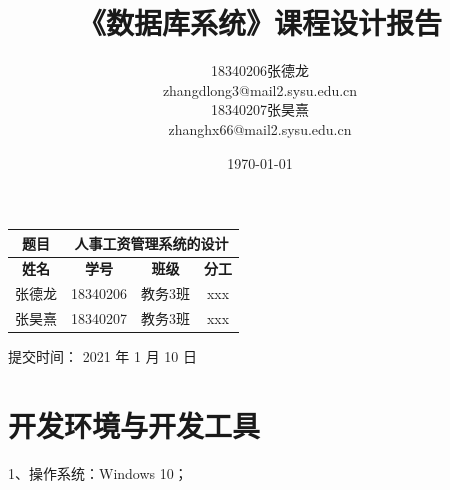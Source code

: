 \documentclass[withoutpreface,bwprint]{cumcmthesis} %
\title{《数据库系统》课程设计报告}
\author{18340206张德龙 \\
	zhangdlong3@mail2.sysu.edu.cn \\
		18340207张昊熹 \\ 
		zhanghx66@mail2.sysu.edu.cn
}
\date{\today}
\begin{document}
	\maketitle 
\begin{table}[H]
\centering
\label{tab:my-table}
\begin{threeparttable}
\begin{tabular}{|c|c|c|c|}
\hline
\textbf{题目} & \multicolumn{3}{c|}{人事工资管理系统的设计}        \\ \hline
\textbf{姓名} & \textbf{学号} & \textbf{班级} & \textbf{分工} \\ \hline
张德龙         & 18340206    & 教务3班        & xxx         \\ \hline
张昊熹         & 18340207    & 教务3班        & xxx         \\ \hline
\end{tabular}
\begin{tablenotes}
    \centering
    \item 提交时间： 2021  年  1    月   10    日
\end{tablenotes}
\end{threeparttable}
\end{table}

%	
%

\section{开发环境与开发工具}
1、操作系统：Windows 10；
\end{document}
